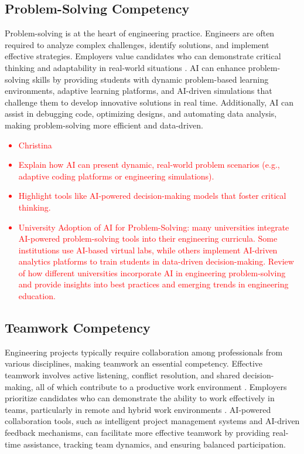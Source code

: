 \documentclass[conference]{IEEEtran}
\begin{document}
\subsection{Problem-Solving Competency}
Problem-solving is at the heart of engineering practice. Engineers are often required to analyze complex challenges, identify solutions, and implement effective strategies. Employers value candidates who can demonstrate critical thinking and adaptability in real-world situations \cite{jonassen2006everyday}. AI can enhance problem-solving skills by providing students with dynamic problem-based learning environments, adaptive learning platforms, and AI-driven simulations that challenge them to develop innovative solutions in real time. Additionally, AI can assist in debugging code, optimizing designs, and automating data analysis, making problem-solving more efficient and data-driven.
\textcolor{red}{
\begin{itemize}
    \item Christina
    \item Explain how AI can present dynamic, real-world problem scenarios (e.g., adaptive coding platforms or engineering simulations).
    \item Highlight tools like AI-powered decision-making models that foster critical thinking.
    \item University Adoption of AI for Problem-Solving: many universities integrate AI-powered problem-solving tools into their engineering curricula. Some institutions use AI-based virtual labs, while others implement AI-driven analytics platforms to train students in data-driven decision-making. Review of how different universities incorporate AI in engineering problem-solving and provide insights into best practices and emerging trends in engineering education.
\end{itemize}
}
\subsection{Teamwork Competency}
Engineering projects typically require collaboration among professionals from various disciplines, making teamwork an essential competency. Effective teamwork involves active listening, conflict resolution, and shared decision-making, all of which contribute to a productive work environment \cite{salas2018teamwork}. Employers prioritize candidates who can demonstrate the ability to work effectively in teams, particularly in remote and hybrid work environments \cite{nace2025competencies}. AI-powered collaboration tools, such as intelligent project management systems and AI-driven feedback mechanisms, can facilitate more effective teamwork by providing real-time assistance, tracking team dynamics, and ensuring balanced participation.
\end{document}
